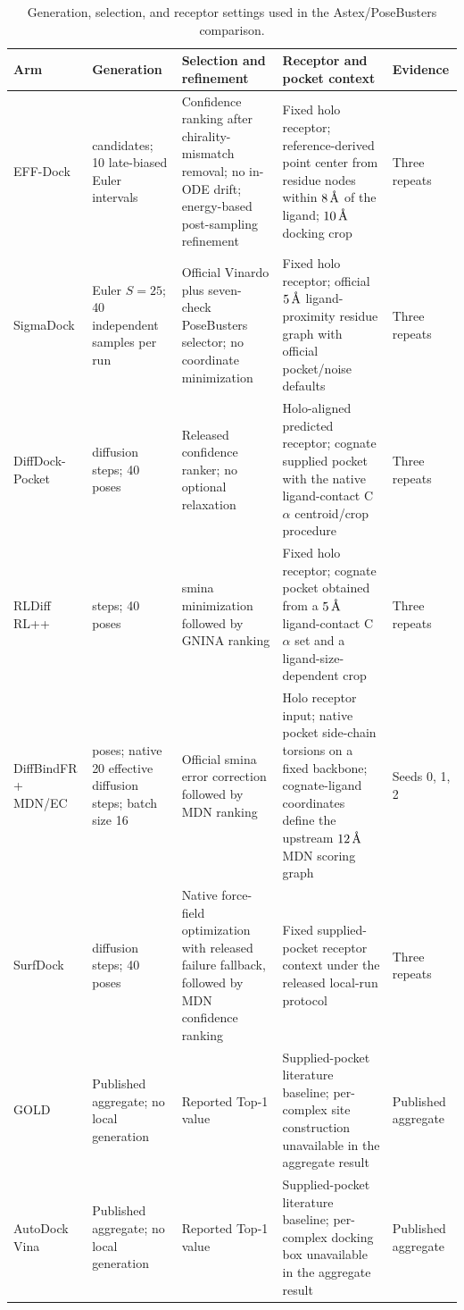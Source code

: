 \documentclass{article}
\newcommand{\method}{EFF-Dock\xspace}
\newcommand{\angstrom}{\text{\normalfont\AA}}
\begin{document}
\begin{table}[htbp]
    \centering
    \scriptsize
    \caption{Generation, selection, and receptor settings used in the Astex/PoseBusters comparison.}
    \label{tab:si_baseline_arms}
    \begin{tabularx}{\textwidth}{@{}>{\raggedright\arraybackslash}p{}>{\raggedright\arraybackslash}X>{\raggedright\arraybackslash}X>{\raggedright\arraybackslash}p{}>{\raggedright\arraybackslash}p{}@{}}
        \toprule
        Arm & Generation & Selection and refinement & Receptor and pocket context & Evidence \\
        \midrule
        \method & 100 candidates; 10 late-biased Euler intervals & Confidence ranking after chirality-mismatch removal; no in-ODE drift; energy-based post-sampling refinement & Fixed holo receptor; reference-derived point center from residue nodes within $8\,\angstrom$ of the ligand; $10\,\angstrom$ docking crop & Three repeats \\
        SigmaDock & Euler $S=25$; 40 independent samples per run & Official Vinardo plus seven-check PoseBusters selector; no coordinate minimization & Fixed holo receptor; official $5\,\angstrom$ ligand-proximity residue graph with official pocket/noise defaults & Three repeats \\
        DiffDock-Pocket & 30 diffusion steps; 40 poses & Released confidence ranker; no optional relaxation & Holo-aligned predicted receptor; cognate supplied pocket with the native ligand-contact C$\alpha$ centroid/crop procedure & Three repeats \\
        RLDiff RL++ & 20 steps; 40 poses & smina minimization followed by GNINA ranking & Fixed holo receptor; cognate pocket obtained from a $5\,\angstrom$ ligand-contact C$\alpha$ set and a ligand-size-dependent crop & Three repeats \\
        DiffBindFR + MDN/EC & 40 poses; native 20 effective diffusion steps; batch size 16 & Official smina error correction followed by MDN ranking & Holo receptor input; native pocket side-chain torsions on a fixed backbone; cognate-ligand coordinates define the upstream $12\,\angstrom$ MDN scoring graph & Seeds 0, 1, 2 \\
        SurfDock & 20 diffusion steps; 40 poses & Native force-field optimization with released failure fallback, followed by MDN confidence ranking & Fixed supplied-pocket receptor context under the released local-run protocol & Three repeats \\
        GOLD & Published aggregate; no local generation & Reported Top-1 value & Supplied-pocket literature baseline; per-complex site construction unavailable in the aggregate result & Published aggregate \\
        AutoDock Vina & Published aggregate; no local generation & Reported Top-1 value & Supplied-pocket literature baseline; per-complex docking box unavailable in the aggregate result & Published aggregate \\
        \bottomrule
    \end{tabularx}
\end{table}
\end{document}
